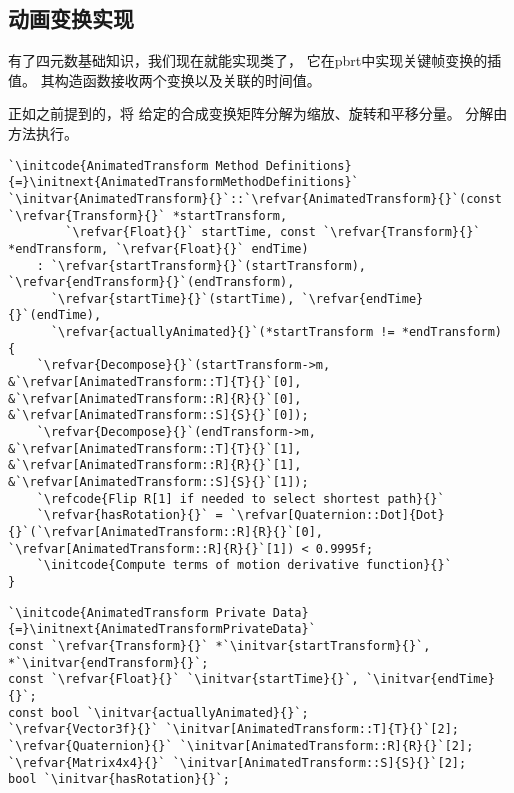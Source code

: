 \subsection{动画变换实现}\label{sub:动画变换实现}
有了四元数基础知识，我们现在就能实现类了，
它在pbrt中实现关键帧变换的插值。
其构造函数接收两个变换以及关联的时间值。

正如之前提到的，将
给定的合成变换矩阵分解为缩放、旋转和平移分量。
分解由方法执行。

\begin{lstlisting}
`\initcode{AnimatedTransform Method Definitions}{=}\initnext{AnimatedTransformMethodDefinitions}`
`\initvar{AnimatedTransform}{}`::`\refvar{AnimatedTransform}{}`(const `\refvar{Transform}{}` *startTransform,
        `\refvar{Float}{}` startTime, const `\refvar{Transform}{}` *endTransform, `\refvar{Float}{}` endTime)
    : `\refvar{startTransform}{}`(startTransform), `\refvar{endTransform}{}`(endTransform),
      `\refvar{startTime}{}`(startTime), `\refvar{endTime}{}`(endTime),
      `\refvar{actuallyAnimated}{}`(*startTransform != *endTransform) {
    `\refvar{Decompose}{}`(startTransform->m, &`\refvar[AnimatedTransform::T]{T}{}`[0], &`\refvar[AnimatedTransform::R]{R}{}`[0], &`\refvar[AnimatedTransform::S]{S}{}`[0]);
    `\refvar{Decompose}{}`(endTransform->m, &`\refvar[AnimatedTransform::T]{T}{}`[1], &`\refvar[AnimatedTransform::R]{R}{}`[1], &`\refvar[AnimatedTransform::S]{S}{}`[1]);
    `\refcode{Flip R[1] if needed to select shortest path}{}`
    `\refvar{hasRotation}{}` = `\refvar[Quaternion::Dot]{Dot}{}`(`\refvar[AnimatedTransform::R]{R}{}`[0], `\refvar[AnimatedTransform::R]{R}{}`[1]) < 0.9995f;
    `\initcode{Compute terms of motion derivative function}{}`
}
\end{lstlisting}

\begin{lstlisting}
`\initcode{AnimatedTransform Private Data}{=}\initnext{AnimatedTransformPrivateData}`
const `\refvar{Transform}{}` *`\initvar{startTransform}{}`, *`\initvar{endTransform}{}`;
const `\refvar{Float}{}` `\initvar{startTime}{}`, `\initvar{endTime}{}`;
const bool `\initvar{actuallyAnimated}{}`;
`\refvar{Vector3f}{}` `\initvar[AnimatedTransform::T]{T}{}`[2];
`\refvar{Quaternion}{}` `\initvar[AnimatedTransform::R]{R}{}`[2];
`\refvar{Matrix4x4}{}` `\initvar[AnimatedTransform::S]{S}{}`[2];
bool `\initvar{hasRotation}{}`;
\end{lstlisting}

